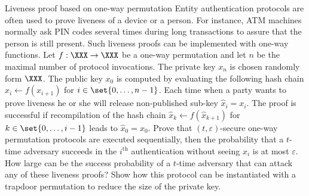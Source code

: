\documentclass{crypto-exercise}
\author{Sven Laur}
\begin{document}
\begin{exercise}{Liveness proof based on one-way permutation}
Entity authentication protocols are often used to prove liveness of a device or a person. For instance, ATM machines normally ask PIN codes several times during long transactions to assure that the person is still present. Such liveness proofs can be implemented with one-way functions. Let $f:\XXX\to\XXX$ be a one-way permutation and let $n$ be the maximal number of protocol invocations. The private key $x_n$ is chosen randomly form $\XXX$. The public key $x_0$ is computed by evaluating the following hash chain $x_i\gets f(x_{i+1})$ for $i\in\set{0,\ldots,n-1}$. Each time when a party wants to prove liveness he or she will release non-published sub-key $\hat{x}_i=x_i$. The proof is successful if recompilation of the hash chain $\hat{x}_k\gets f(\hat{x}_{k+1})$ for $k\in\set{0,\ldots,i-1}$ leads to  $\hat{x}_0=x_0$. Prove that $(t,\varepsilon)$-secure one-way permutation protocols are executed sequentially, then the probability that a $t$-time adversary succeeds in the $i^{\text{th}}$ authentication without seeing $x_i$ is at most $\varepsilon$. How large can be the success probability of a $t$-time adversary that can attack any of these liveness proofs? Show how this protocol can be instantiated with a trapdoor permutation to reduce the size of the private key.

\end{exercise}
\end{document}
